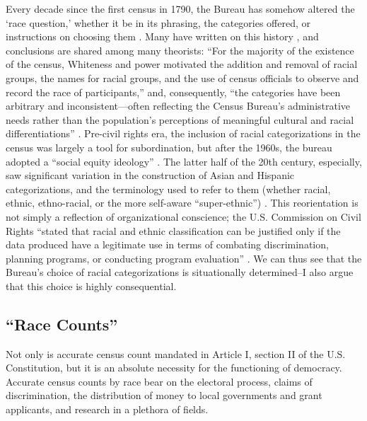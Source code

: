 Every decade since the first census in 1790, the Bureau has somehow altered the `race question,' whether it be in its phrasing, the categories offered, or instructions on choosing them \cite{strmic-pawl_race_2018}. Many have written on this history \cite{espiritu_asian_1992, prewitt_what_2013, strmic-pawl_race_2018, hochschild_racial_2008}, and conclusions are shared among many theorists: ``For the majority of the existence of the census, Whiteness and power motivated the addition and removal of racial groups, the names for racial groups, and the use of census officials to observe and record the race of participants,'' and, consequently, ``the categories have been arbitrary and inconsistent---often reflecting the Census Bureau’s administrative needs rather than the population's perceptions of meaningful cultural and racial differentiations'' \cite{espiritu_asian_1992, strmic-pawl_race_2018}. Pre-civil rights era, the inclusion of racial categorizations in the census was largely a tool for subordination, but after the 1960s, the bureau adopted a ``social equity ideology'' \cite{strmic-pawl_race_2018}. The latter half of the 20th century, especially, saw significant variation in the construction of Asian and Hispanic categorizations, and the terminology used to refer to them (whether racial, ethnic, ethno-racial, or the more self-aware ``super-ethnic'') \cite{espiritu_asian_1992, choldin_statistics_1986}. This reorientation is not simply a reflection of organizational conscience; the U.S. Commission on Civil Rights ``stated that racial and ethnic classification can be justified only if the data produced have a legitimate use in terms of combating discrimination, planning programs, or conducting program evaluation'' \cite{humes_measurement_2009}. We can thus see that the Bureau’s choice of racial categorizations is situationally determined--I also argue that this choice is highly consequential.

\subsection{``Race Counts''}\label{sec:race-counts}

Not only is accurate census count mandated in Article I, section II of the U.S. Constitution, but it is an absolute necessity for the functioning of democracy. Accurate census counts by race bear on the electoral process, claims of discrimination, the distribution of money to local governments and grant applicants, and research in a plethora of fields. 

